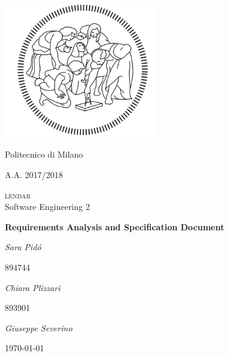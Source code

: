 \documentclass[12pt,titlepage]{article}
\begin{document}
\begin{titlepage}
\centering
\includegraphics[width=0.5\textwidth]{Logo}\par
	{{Politecnico di Milano} \par}
	{{A.A. 2017/2018} \par}
	\vspace{1.5cm}
	{\Large{\textsc{{{}lendar{\color{red}{+}}}} \\ 
		Software Engineering 2} \par}
	\vspace{1.5cm}
	{\huge \textbf{Requirements Analysis and Specification Document} \par}
	\vspace{1.5cm}
	{\Large\itshape Sara Pid\'o  }{\Large   {  894744}\par}
	{\Large\itshape Chiara Plizzari }{\Large   {  893901}\par}
	{\Large\itshape Giuseppe Severino\par}
	\vspace{2cm}
	\vfill
	\pagebreak
	{\large \today \par}
\end{titlepage}




%


 


\end{document}
